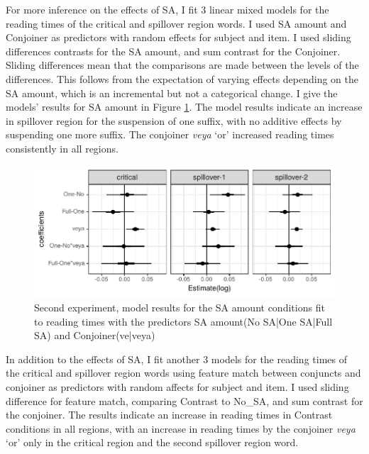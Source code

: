 For more inference on the effects of SA, I fit 3 linear mixed models for the reading times of the critical and spillover region words. I used SA amount and Conjoiner as predictors with random effects for subject and item. I used sliding differences contrasts for the SA amount, and sum contrast for the Conjoiner. Sliding differences mean that the comparisons are made between the levels of the differences. This follows from the expectation of varying effects depending on the SA amount, which is an incremental but not a categorical change. I give the models' results for SA amount in Figure \ref{fig:targetmodels}. The model results indicate an increase in spillover region for the suspension of one suffix, with no additive effects by suspending one more suffix. The conjoiner \textit{veya} `or' increased reading times consistently in all regions.

\begin{knitrout}
\color{fgcolor}\begin{figure}[hbt!]

{\centering \includegraphics[]{experiments/selfpaced/report/figure/targetmodels-1.pdf} 

}

\caption[Second experiment, model results for the SA amount conditions fit to reading times with the predictors SA amount(No SA|One SA|Full SA) and Conjoiner(ve|veya)]{Second experiment, model results for the SA amount conditions fit to reading times with the predictors SA amount(No SA|One SA|Full SA) and Conjoiner(ve|veya)}\label{fig:targetmodels}
\end{figure}


\end{knitrout}


In addition to the effects of SA, I fit another 3 models for the reading times of the critical and spillover region words using feature match between conjuncts and conjoiner as predictors with random affects for subject and item. I used sliding difference for feature match, comparing Contrast to No\_SA, and sum contrast for the conjoiner. The results indicate an increase in reading times in Contrast conditions in all regions, with an increase in reading times by the conjoiner \textit{veya} `or' only in the critical region and the second spillover region word.


